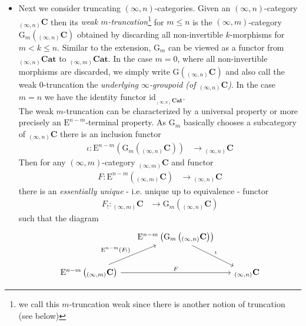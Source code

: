 \begin{itemize}
\item
Next we consider truncating $(\infty,n)$-categories. Given an $(\infty,n)$-category ${_{(\infty,n)}}\mathbf{C}$ then its \textit{weak $m$-truncation}\footnote{we call this $m$-truncation weak since there is another notion of truncation (see below)} for $m \leq n$ is the $(\infty,m)$-category $\mathrm{G}_{m}({_{(\infty,n)}}\mathbf{C})$ obtained by discarding all non-invertible $k$-morphisms for $m < k \leq n$. Similar to the extension, $\mathrm{G}_{m}$ can be viewed as a functor from ${_{(\infty,n)}}\mathbf{Cat}$ to ${_{(\infty,m)}}\mathbf{Cat}$. In the case $m = 0$, where all non-invertible morphisms are discarded, we simply write $\mathrm{G}({_{(\infty,n)}}\mathbf{C})$ and also call the weak $0$-truncation the \textit{underlying $\infty$-groupoid (of ${_{(\infty,n)}}\mathbf{C}$)}. In the case $m=n$ we have the identity functor $\mathrm{id}_{{_{(\infty,n)}}\mathbf{Cat}}$.
\\
The weak $m$-truncation can be characterized by a universal property or more precisely an $\mathrm{E}^{n-m}$-terminal property. As $\mathrm{G}_{m}$ basically chooses a subcategory of ${_{(\infty,n)}}\mathbf{C}$ there is an inclusion functor
\begin{align*}
  \iota
  \colon
  \mathrm{E}^{n-m}
  \left(
    \mathrm{G}_{m}
    \left(
      {_{(\infty,n)}}\mathbf{C}
    \right)
  \right)
  &\to
  {_{(\infty,n)}}\mathbf{C}
\end{align*}
Then for any $(\infty,m)$-category ${_{(\infty,m)}}\mathbf{C}$ and functor
\begin{align*}
  F
  \colon
  \mathrm{E}^{n-m}
  \left(
    {_{(\infty,m)}}\mathbf{C}
  \right)
  &\to
  {_{(\infty,n)}}\mathbf{C}
\end{align*}
there is an \textit{essentially unique} - i.e. unique up to equivalence - functor
\begin{align*}
  F_{!}
  \colon
  {_{(\infty,m)}}\mathbf{C}
  &\to
  \mathrm{G}_{m}
  \left(
    {_{(\infty,n)}}\mathbf{C}
  \right)
\end{align*}
such that the diagram
\begin{equation*}
\begin{tikzcd}[row sep=2.4em,column sep=1.6em]
  &
  \mathrm{E}^{n-m}
  \left(
    \mathrm{G}_{m}
    \left(
      {_{(\infty,n)}}\mathbf{C}
    \right)
  \right)
  \ar{rd}{\iota}
  &
  \\
  \mathrm{E}^{n-m}
  \left(
    {_{(\infty,m)}}\mathbf{C}
  \right)
  \ar{ur}{\mathrm{E}^{n-m}(F_{!})}
  \ar{rr}{F}
  &
  &
  {_{(\infty,n)}}\mathbf{C}
\end{tikzcd}

\end{equation*}
\end{itemize}
